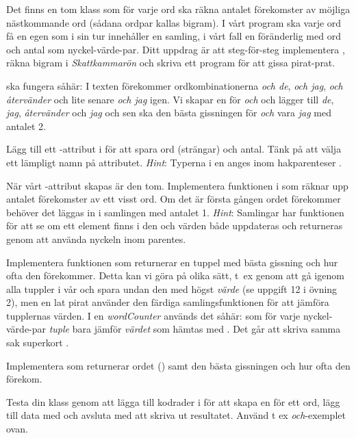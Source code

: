 Det finns en tom klass  som för varje ord ska räkna antalet förekomster av möjliga nästkommande ord (sådana ordpar kallas bigram). I vårt program ska varje ord få en egen  som i sin tur innehåller en samling, i vårt fall en föränderlig  med ord och antal som nyckel-värde-par. Ditt uppdrag är att steg-för-steg implementera , räkna bigram i \emph{Skattkammarön} och skriva ett program för att gissa pirat-prat. 


 ska fungera såhär: I texten förekommer ordkombinationerna \emph{och de}, \emph{och jag}, \emph{och återvänder} och lite senare \emph{och jag} igen. Vi skapar en  för \emph{och} och lägger till \emph{de}, \emph{jag}, \emph{återvänder} och \emph{jag} och sen ska den bästa gissningen för \emph{och} vara \emph{jag} med antalet 2. 


\Subtask Lägg till ett -attribut i  för att spara ord (strängar) och antal. Tänk på att välja ett lämpligt namn på attributet. \emph{Hint}: Typerna i en  anges inom hakparenteser . 

\Subtask När vårt -attribut skapas är den tom. Implementera funktionen  i  som räknar upp antalet förekomster av ett visst ord. Om det är första gången ordet förekommer behöver det läggas in i samlingen med antalet 1. \emph{Hint}: Samlingar har funktionen  för att se om ett element finns i den och värden både uppdateras och returneras genom att använda nyckeln inom parentes.

\Subtask Implementera funktionen  som returnerar en tuppel med bästa gissning och hur ofta den förekommer. Detta kan vi göra på olika sätt, t~ex genom att gå igenom alla tuppler i vår  och spara undan den med högst \emph{värde} (se uppgift 12 i övning 2), men en lat pirat använder den färdiga samlingsfunktionen  för att jämföra tupplernas värden. I en  \emph{wordCounter} används det såhär:  som för varje nyckel-värde-par \emph{tuple} bara jämför \emph{värdet} som hämtas med . Det går att skriva samma sak superkort .

\Subtask Implementera  som returnerar ordet () samt den bästa gissningen och hur ofta den förekom. 

\Subtask Testa din klass genom att lägga till kodrader i  för att skapa en  för ett ord, lägg till data med  och avsluta med att skriva ut resultatet. Använd t ex  \emph{och}-exemplet ovan.

